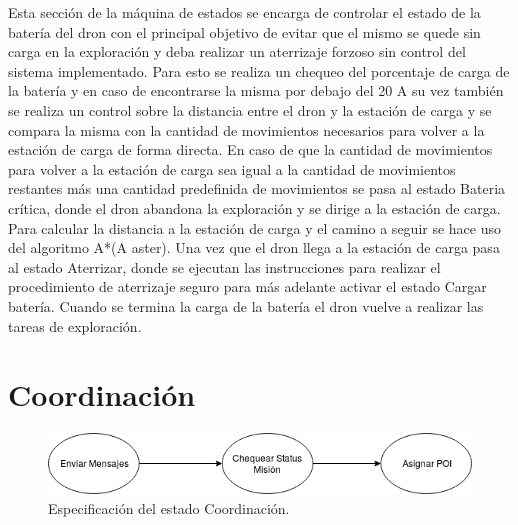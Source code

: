 Esta sección de la máquina de estados se encarga de controlar el estado de la batería del dron con el principal objetivo de evitar que el mismo se quede sin carga en la exploración y deba realizar un aterrizaje forzoso sin control del sistema implementado.
Para esto se realiza un chequeo del porcentaje de carga de la  batería y en caso de encontrarse la misma por debajo del 20%
A su vez también se realiza un control sobre la distancia entre el dron y la estación de carga y se compara la misma con la cantidad de movimientos necesarios para volver a la estación de carga de forma directa. En caso de que la cantidad de movimientos para volver a la estación de carga sea igual a la cantidad de movimientos restantes más una cantidad predefinida de movimientos se pasa al estado Bateria crítica, donde el dron abandona la exploración y se dirige a la estación de carga. 
Para calcular la distancia a la estación de carga y el camino a seguir se hace uso del algoritmo A*(A aster).
Una vez que el dron llega a la estación de carga pasa al estado Aterrizar, donde se ejecutan las instrucciones para realizar el procedimiento de aterrizaje seguro para más adelante activar el estado Cargar batería. Cuando se termina la carga de la batería el dron vuelve a realizar las tareas de exploración.
\section {Coordinación}


\begin{figure}[h!]
	\label{fig:comp}
	\includegraphics[width=.8\textwidth]{imagenes/chap5/image6}
	\caption{Especificación del estado Coordinación.}
\end{figure}

